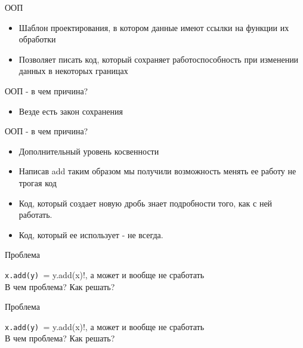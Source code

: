 \documentclass{article}
\begin{document}
\begin{center} ООП \end{center}
\begin{itemize}
    \item Шаблон проектирования, в котором данные имеют 
            ссылки на функции их обработки
    \item Позволяет писать код, который сохраняет работоспособность 
            при изменении данных в некоторых границах
\end{itemize}
\newpage

\begin{center} ООП - в чем причина? \end{center}
\begin{itemize}
    \item Везде есть закон сохранения
\end{itemize}
\newpage

\begin{center} ООП - в чем причина? \end{center}
\begin{itemize}
    \item Дополнительный уровень косвенности
    \item Написав add таким образом мы получили возможность 
            менять ее работу не трогая код
    \item Код, который создает новую дробь знает подробности того, как с ней работать.
    \item Код, который ее использует - не всегда.
\end{itemize}
\newpage

\begin{center} Проблема \end{center}
    \lstinline!x.add(y) != y.add(x)!, а может и вообще не сработать \\
    В чем проблема? Как решать?
\newpage

\begin{center} Проблема \end{center}
    \lstinline!x.add(y) != y.add(x)!, а может и вообще не сработать \\
    В чем проблема? Как решать? \\
\end{document}
